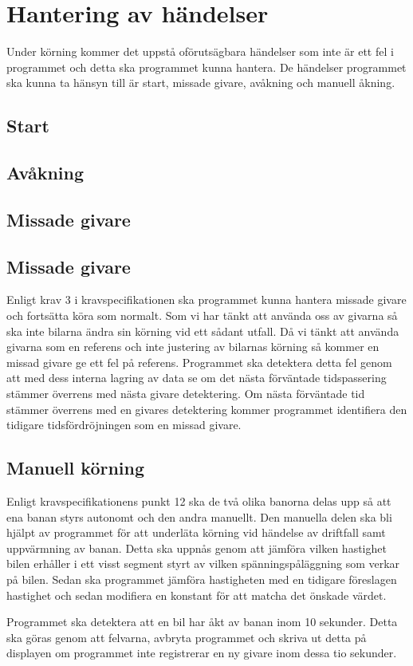 \section{Hantering av händelser}
Under körning kommer det uppstå oförutsägbara händelser som inte är ett fel i programmet och detta ska programmet kunna hantera. De händelser programmet ska kunna ta hänsyn till är start, missade givare, avåkning och manuell åkning.

\subsection{Start} 

\subsection{Avåkning} 

\subsection{Missade givare} 


\subsection{Missade givare}

Enligt krav 3 i kravspecifikationen ska programmet kunna hantera missade givare och fortsätta köra som normalt. Som vi har tänkt att använda oss av givarna så ska inte bilarna ändra sin körning vid ett sådant utfall. Då vi tänkt att använda givarna som en referens och inte justering av bilarnas körning så kommer en missad givare ge ett fel på referens. Programmet ska detektera detta fel genom att med dess interna lagring av data se om det nästa förväntade tidspassering stämmer överrens med nästa givare detektering. Om nästa förväntade tid stämmer överrens med en givares detektering kommer programmet identifiera den tidigare tidsfördröjningen som en missad givare.


\subsection{Manuell körning}
Enligt kravspecifikationens punkt 12 ska de två olika banorna delas upp så att ena banan styrs autonomt och den andra manuellt. 
Den manuella delen ska bli hjälpt av programmet för att underläta körning vid händelse av driftfall samt uppvärmning av banan.
Detta ska uppnås genom att jämföra vilken hastighet bilen erhåller i ett visst segment styrt av vilken spänningspåläggning som verkar på bilen.
Sedan ska programmet  jämföra hastigheten med en tidigare föreslagen hastighet och sedan modifiera en konstant för att matcha det önskade värdet.

Programmet ska detektera att en bil har åkt av banan inom 10 sekunder. Detta ska göras genom att felvarna, avbryta programmet och skriva ut detta på displayen om programmet inte registrerar en ny givare inom dessa tio sekunder.
